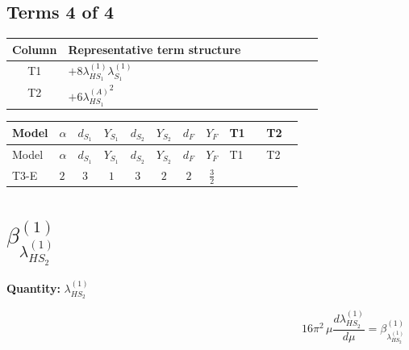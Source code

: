 \documentclass[8pt]{article}
\begin{document}
\begin{landscape}
\subsection*{Terms 4 of 4}
\begin{center}
\begin{tabular}{@{}c >{\raggedright\arraybackslash}p{0.82\linewidth}@{}}
\toprule
Column & Representative term structure \\
\midrule
T1 & \(\displaystyle +8 {\lambda_{HS_1}^{(1)}} {\lambda_{S_1}^{(1)}}\) \\
\midrule
T2 & \(\displaystyle +6 {\lambda_{HS_1}^{(A)}}^2\) \\
\midrule
\bottomrule
\end{tabular}
\end{center}
\smallskip
\tiny
\begin{longtable}{@{}llcccccc >{\raggedright\arraybackslash}p{0.21\linewidth} >{\raggedright\arraybackslash}p{0.21\linewidth}@{}}
\toprule
Model & $\alpha$ & $d_{S_1}$ & $Y_{S_1}$ & $d_{S_2}$ & $Y_{S_2}$ & $d_F$ & $Y_F$ & T1 & T2 \\
\midrule
\endfirsthead
\toprule
Model & $\alpha$ & $d_{S_1}$ & $Y_{S_1}$ & $d_{S_2}$ & $Y_{S_2}$ & $d_F$ & $Y_F$ & T1 & T2 \\
\midrule
\endhead
T3-E & $2$ & $3$ & $1$ & $3$ & $2$ & $2$ & $\frac{3}{2}$ & \scriptsize\adjustbox{max width=\linewidth}{$\begin{gathered} +8 {\lambda_{HS_1}^{(1)}} {\lambda_{S_1}^{(1)}}\end{gathered}$} & \scriptsize\adjustbox{max width=\linewidth}{$\begin{gathered} +6 {\lambda_{HS_1}^{(A)}}^2\end{gathered}$} \\
\midrule
\bottomrule
\end{longtable}
\clearpage
\section*{$\beta_{\lambda_{HS_2}^{(1)}}^{(1)}$}
\noindent\textbf{Quantity: }$\lambda_{HS_2}^{(1)}$\par\smallskip
\[16\pi^2\,\mu\frac{d \lambda_{HS_2}^{(1)}}{d\mu}=\beta_{\lambda_{HS_2}^{(1)}}^{(1)}\]

\end{landscape}
\end{document}
